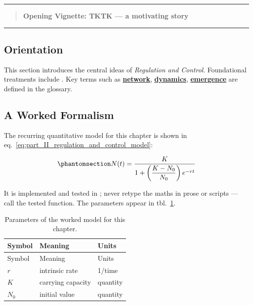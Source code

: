 \documentclass[
]{article}
\theoremstyle{plain}
\theoremstyle{definition}
\begin{document}
\begin{center}\rule{0.5\linewidth}{0.5pt}\end{center}

\begin{quote}
\textbf{Opening Vignette: TKTK --- a motivating story}
\end{quote}

\begin{center}\rule{0.5\linewidth}{0.5pt}\end{center}

\subsection{Orientation}\label{orientation-7}

This section introduces the central ideas of \emph{Regulation and
Control}. Foundational treatments include
\citep{wilson2021analysis, taylor2019theory}. Key terms such as
\hyperref[gl:network]{\textbf{network}},
\hyperref[gl:dynamics]{\textbf{dynamics}},
\hyperref[gl:emergence]{\textbf{emergence}} are defined in the glossary.

\subsection{A Worked Formalism}\label{a-worked-formalism-7}

The recurring quantitative model for this chapter is shown in
eq.~\ref{eq:part_II_regulation_and_control_model}:

\begin{equation}\protect\phantomsection\label{eq:part_II_regulation_and_control_model}{ N(t) = \frac{K}{1 + \left(\dfrac{K - N_0}{N_0}\right) e^{-rt}} }\end{equation}

It is implemented and tested in
; never retype the maths in
prose or scripts --- call the tested function. The parameters appear in
tbl.~\ref{tbl:part_II_regulation_and_control_parameters}.

\begin{longtable}[]{@{}lll@{}}
\caption{Parameters of the worked model for this
chapter.}\label{tbl:part_II_regulation_and_control_parameters}\tabularnewline
\toprule\noalign{}
Symbol & Meaning & Units \\
\midrule\noalign{}
\endfirsthead
\toprule\noalign{}
Symbol & Meaning & Units \\
\midrule\noalign{}
\endhead
\bottomrule\noalign{}
\endlastfoot
\(r\) & intrinsic rate & 1/time \\
\(K\) & carrying capacity & quantity \\
\(N_0\) & initial value & quantity \\
\end{longtable}
\end{document}
